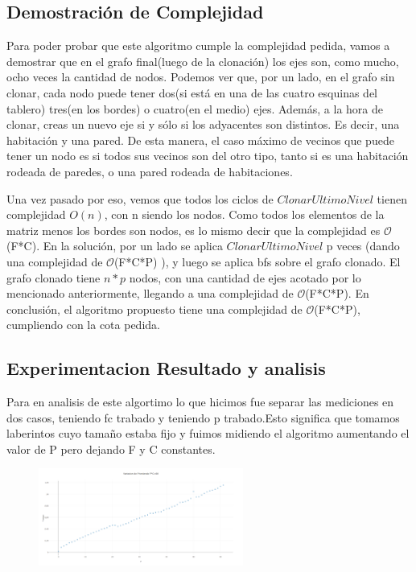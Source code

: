\documentclass[spanish,12pt]{article}
\begin{document}
\subsection{Demostración de Complejidad}
Para poder probar que este algoritmo cumple la complejidad pedida, vamos a demostrar que en el grafo final(luego de la clonación) los ejes son, como mucho, ocho veces la cantidad de nodos.
Podemos ver que, por un lado, en el grafo sin clonar, cada nodo puede tener dos(si está en una de las cuatro esquinas del tablero) tres(en los bordes) o cuatro(en el medio) ejes. Además, a la hora de clonar, creas un nuevo eje si y sólo si los adyacentes son distintos. Es decir, una habitación y una pared. De esta manera, el caso máximo de vecinos que puede tener un nodo es si todos sus vecinos son del otro tipo, tanto si es una habitación rodeada de paredes, o una pared rodeada de habitaciones.

Una vez pasado por eso, vemos que todos los ciclos de $ClonarUltimoNivel$ tienen complejidad $O(n)$, con n siendo los nodos. Como todos los elementos de la matriz menos los bordes son nodos, es lo mismo decir que la complejidad es $\mathcal{O}$(F*C). En la solución, por un lado se aplica $ClonarUltimoNivel$ p veces (dando una complejidad de $\mathcal{O}$(F*C*P) ), y luego se aplica bfs sobre el grafo clonado. El grafo clonado tiene $n*p$ nodos, con una cantidad de ejes acotado por lo mencionado anteriormente, llegando a una complejidad de $\mathcal{O}$(F*C*P). En conclusión, el algoritmo propuesto tiene una complejidad de $\mathcal{O}$(F*C*P), cumpliendo con la cota pedida.
\subsection{Experimentacion Resultado y analisis }
Para en analisis de este algortimo lo que hicimos fue separar las mediciones en dos casos, teniendo fc trabado y teniendo p trabado.Esto significa que tomamos laberintos cuyo tamaño estaba fijo y fuimos midiendo el algoritmo
aumentando el valor de P pero dejando F y C constantes.



\begin{figure}[H]
\centering
\includegraphics     [width=0.6\textwidth]{fcfijo}
\caption{}
\end{figure}
\end{document}
